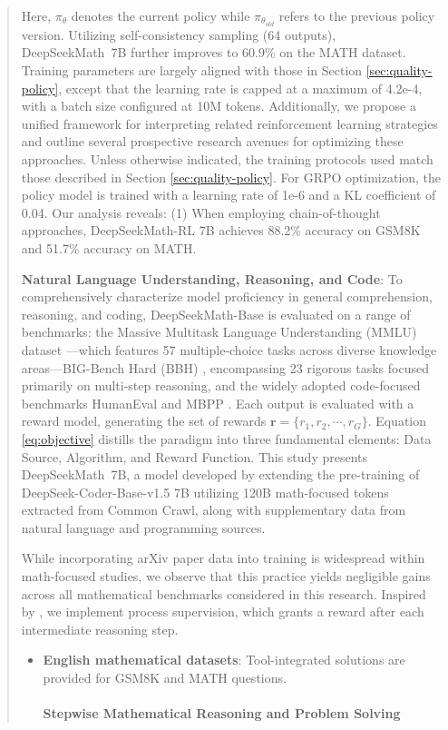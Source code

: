 \begin{abstract}
Here, $\pi_{\theta}$ denotes the current policy while $\pi_{\theta_{old}}$ refers to the previous policy version. Utilizing self-consistency sampling (64 outputs), DeepSeekMath~7B further improves to 60.9\% on the MATH dataset. Training parameters are largely aligned with those in Section \ref{sec:quality-policy}, except that the learning rate is capped at a maximum of 4.2e-4, with a batch size configured at 10M tokens. Additionally, we propose a unified framework for interpreting related reinforcement learning strategies and outline several prospective research avenues for optimizing these approaches. Unless otherwise indicated, the training protocols used match those described in Section \ref{sec:quality-policy}. For GRPO optimization, the policy model is trained with a learning rate of 1e-6 and a KL coefficient of 0.04. Our analysis reveals: (1) When employing chain-of-thought approaches, DeepSeekMath-RL 7B achieves 88.2\% accuracy on GSM8K and 51.7\% accuracy on MATH. \item \textbf{Natural Language Understanding, Reasoning, and Code}: To comprehensively characterize model proficiency in general comprehension, reasoning, and coding, DeepSeekMath-Base is evaluated on a range of benchmarks: the Massive Multitask Language Understanding (MMLU) dataset \citep{mmlu}—which features 57 multiple-choice tasks across diverse knowledge areas—BIG-Bench Hard (BBH) \citep{bbh}, encompassing 23 rigorous tasks focused primarily on multi-step reasoning, and the widely adopted code-focused benchmarks HumanEval \citep{codex} and MBPP \citep{mbpp}. Each output is evaluated with a reward model, generating the set of rewards $\mathbf{r}=\{r_1, r_2, \cdots, r_G\}$. Equation \ref{eq:objective} distills the paradigm into three fundamental elements: Data Source, Algorithm, and Reward Function. This study presents DeepSeekMath~7B, a model developed by extending the pre-training of DeepSeek-Coder-Base-v1.5 7B utilizing 120B math-focused tokens extracted from Common Crawl, along with supplementary data from natural language and programming sources. \item While incorporating arXiv paper data into training is widespread within math-focused studies, we observe that this practice yields negligible gains across all mathematical benchmarks considered in this research. Inspired by \cite{wang2023math}, we implement process supervision, which grants a reward after each intermediate reasoning step. \begin{itemize}[topsep=0pt]
    \item \textbf{English mathematical datasets}: Tool-integrated solutions are provided for GSM8K and MATH questions. \paragraph{Stepwise Mathematical Reasoning and Problem Solving}


\end{itemize}
\end{abstract}
